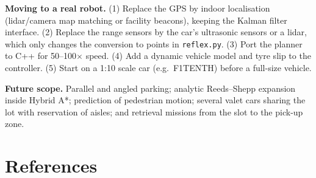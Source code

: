 \documentclass[12pt,a4paper]{article}
\begin{document}
\textbf{Moving to a real robot.} (1) Replace the GPS by indoor localisation (lidar/camera map matching or facility beacons), keeping the Kalman filter interface. (2) Replace the range sensors by the car's ultrasonic sensors or a lidar, which only changes the conversion to points in \texttt{reflex.py}. (3) Port the planner to C++ for 50--100$\times$ speed. (4) Add a dynamic vehicle model and tyre slip to the controller. (5) Start on a 1:10 scale car (e.g.\ F1TENTH) before a full-size vehicle.

\textbf{Future scope.} Parallel and angled parking; analytic Reeds--Shepp expansion inside Hybrid A*; prediction of pedestrian motion; several valet cars sharing the lot with reservation of aisles; and retrieval missions from the slot to the pick-up zone.

\section*{References}
\end{document}
